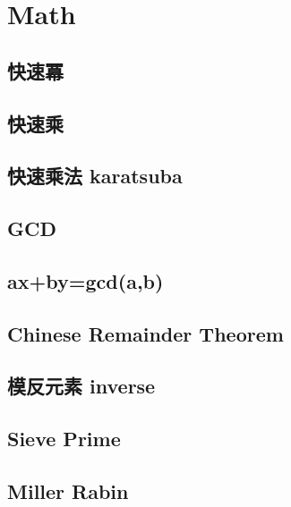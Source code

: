 \section{Math}

\subsection{快速冪}


\subsection{快速乘}


\subsection{快速乘法 karatsuba}


\subsection{GCD}


\subsection{ax+by=gcd(a,b)}


\subsection{Chinese Remainder Theorem}


\subsection{模反元素 inverse}


\subsection{Sieve Prime}


\subsection{Miller Rabin}


